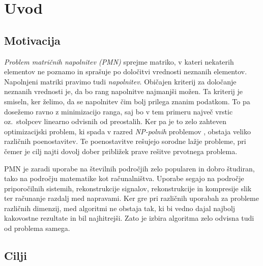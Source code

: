 \chapter{Uvod}
\section{Motivacija}
\textit{Problem matričnih napolnitev (PMN)} sprejme matriko, v kateri nekaterih elementov ne poznamo in sprašuje po določitvi vrednosti neznanih elementov. Napolnjeni matriki pravimo tudi \textit{napolnitev}. Običajen kriterij za določanje neznanih vrednosti je, da bo rang napolnitve najmanjši možen.
Ta kriterij je smiseln, ker želimo, da se napolnitev čim bolj prilega znanim podatkom. To pa dosežemo ravno z minimizacijo ranga, saj bo v tem primeru največ vrstic oz.\ stolpcev linearno odvisnih od preostalih.
Ker pa je to zelo zahteven optimizacijski problem, ki spada v razred \textit{NP-polnih} problemov \cite{Survey-NKS19},
obstaja veliko različnih poenostavitev.
Te poenostavitve rešujejo sorodne lažje probleme, pri čemer je cilj najti dovolj dober približek prave rešitve prvotnega problema. 

PMN je zaradi uporabe na številnih področjih zelo
popularen in dobro študiran, tako na področju matematike kot računalništva.
Uporabe segajo na področje priporočilnih sistemih, rekonstrukcije signalov, rekonstrukcije in kompresije slik ter računanje razdalj med napravami.
Ker gre pri različnih uporabah za probleme različnih dimenzij, med algoritmi ne obstaja tak, ki bi vedno dajal najbolj kakovostne rezultate in bil najhitrejši. Zato je izbira algoritma zelo odvisna tudi od problema samega. 

\iffalse
\CG{Algoritme testiramo in primerjamo na problemih razreševanja neznanih pikslov v slikah. Videli bomo, da poznamo boljše algoritme, ki rešujejo ta problem. Ker pa potrebujemo za izračun napake nezašumljeno matriko, je ta vrsta podatkov primerna. Tudi literatura za namene testiranja uporablja slike ali pa naključno generirane podatke. Ker pa lahko slike tudi vizualno opazujemo, se v diplomskem delu osredotočamo na te.} 

V diplomi bomo predstavili par algoritmov, ki rešujejo omenjen problem ter pokazali in razložili njihove ideje. Algoritmi so bili izbrani glede na njihovo popularnost in priznanost v literaturi. Prav tako poskrbimo, da so algoritmi primerno različni in temeljijo na drugačnih principih.
\fi

\section{Cilji}

